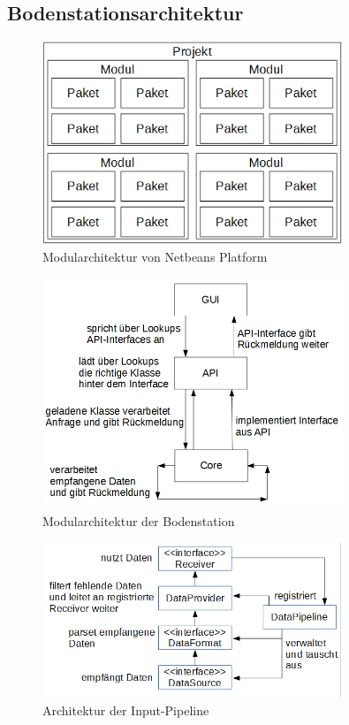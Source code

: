\newpage

\subsection{Bodenstationsarchitektur}
\begin{figure}[H]
	\centering
	\includegraphics[width=0.8\textwidth]{3_Beschreibung_der_Bodenstation/NBP_Modularchitektur.png}
	\caption{Modularchitektur von Netbeans Platform}
	\label{nbp_modularchitektur}
\end{figure}

\begin{figure}[H]
	\centering
	\includegraphics[width=0.8\textwidth]{3_Beschreibung_der_Bodenstation/Bodenstation_Modularchitektur.png}
	\caption{Modularchitektur der Bodenstation}
	\label{station_modularchitektur}
\end{figure}
\vspace{-5cm}

\newpage

\begin{figure}[H]
	\centering
	\includegraphics[width=0.8\textwidth]{3_Beschreibung_der_Bodenstation/Input-Pipeline_Architektur.png}
	\caption{Architektur der Input-Pipeline}
	\label{inputpipeline}
\end{figure}

\newpage

